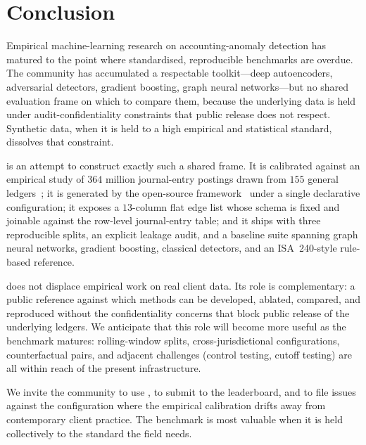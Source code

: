 \section{Conclusion}
\label{sec:conclusion}

Empirical machine-learning research on accounting-anomaly detection
has matured to the point where standardised, reproducible
benchmarks are overdue.  The community has accumulated a respectable
toolkit---deep autoencoders, adversarial detectors, gradient
boosting, graph neural networks---but no shared evaluation frame on
which to compare them, because the underlying data is held under
audit-confidentiality constraints that public release does not
respect.  Synthetic data, when it is held to a high empirical and
statistical standard, dissolves that constraint.

\bench{} is an attempt to construct exactly such a shared frame.
It is calibrated against an empirical study of $364$ million
journal-entry postings drawn from $155$ general
ledgers~\citep{ivertowski2024apn}; it is generated by the
open-source \system{} framework~\citep{ivertowski2026datasynth,
datasynth-repo} under a single declarative configuration; it
exposes a $13$-column flat edge list whose schema is fixed and
joinable against the row-level journal-entry table; and it ships
with three reproducible splits, an explicit leakage audit, and a
baseline suite spanning graph neural networks, gradient boosting,
classical detectors, and an ISA~240-style rule-based reference.

\bench{} does not displace empirical work on real client data.
Its role is complementary: a public reference against which methods
can be developed, ablated, compared, and reproduced without the
confidentiality concerns that block public release of the
underlying ledgers.  We anticipate that this role will become more
useful as the benchmark matures: rolling-window splits,
cross-jurisdictional configurations, counterfactual pairs, and
adjacent challenges (control testing, cutoff testing) are all
within reach of the present infrastructure.

We invite the community to use \bench{}, to submit to the
leaderboard, and to file issues against the configuration where
the empirical calibration drifts away from contemporary client
practice.  The benchmark is most valuable when it is held
collectively to the standard the field needs.
